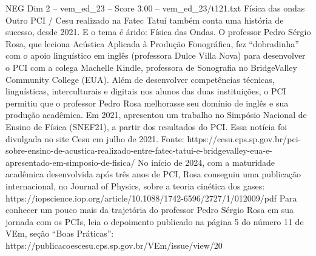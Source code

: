 \begin{textsample}{NEG Dim 2 – vem\_ed\_23 – Score 3.00 – vem\_ed\_23/t121.txt}  \label{ex:f2_neg_082}
Física das ondas Outro PCI / Cesu realizado na Fatec Tatuí também conta uma história de sucesso, desde 2021.
E o tema é árido: Física das Ondas.
O professor Pedro Sérgio Rosa, que leciona Acústica Aplicada à Produção Fonográfica, fez “dobradinha” com o apoio linguístico em inglês (professora Dulce Villa Nova) para desenvolver o PCI com a colega Machelle Kindle, professora de Sonografia no BridgeValley Community College (EUA).
Além de desenvolver competências técnicas, linguísticas, interculturais e digitais nos alunos das duas instituições, o PCI permitiu que o professor Pedro Rosa melhorasse seu domínio de inglês e sua produção acadêmica.
Em 2021, apresentou um trabalho no Simpósio Nacional de Ensino de Física (SNEF21), a partir dos resultados do PCI.
Essa notícia foi divulgada no site Cesu em julho de 2021.
Fonte: https://cesu.cps.sp.gov.br/pci-sobre-ensino-de-acustica-realizado-entre-fatec-tatui-e-bridgevalley-eua-e-apresentado-em-simposio-de-fisica/ No início de 2024, com a maturidade acadêmica desenvolvida após três anos de PCI, Rosa conseguiu uma publicação internacional, no Journal of Physics, sobre a teoria cinética dos gases: https://iopscience.iop.org/article/10.1088/1742-6596/2727/1/012009/pdf Para conhecer um pouco mais da trajetória do professor Pedro Sérgio Rosa em sua jornada com os PCIs, leia o depoimento publicado na página 5 do número 11 de VEm, seção “Boas Práticas”: https://publicacoescesu.cps.sp.gov.br/VEm/issue/view/20

\end{textsample}
